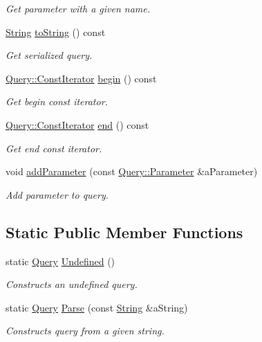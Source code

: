 \begin{DoxyCompactItemize}
\begin{DoxyCompactList}\small\item\em Get parameter with a given name. \end{DoxyCompactList}\item 
\hyperlink{namespaceostk_1_1io_a95d49b120613a7610cb1b4f03b1116b6}{String} \hyperlink{classostk_1_1io_1_1url_1_1_query_aca282853530302e594b16700c83169d9}{to\+String} () const
\begin{DoxyCompactList}\small\item\em Get serialized query. \end{DoxyCompactList}\item 
\hyperlink{classostk_1_1io_1_1url_1_1_query_a64eb73f998c55a48d25b4ce116d66f1a}{Query\+::\+Const\+Iterator} \hyperlink{classostk_1_1io_1_1url_1_1_query_a6c40e85de4a1a42ec5c8ee268e074e6f}{begin} () const
\begin{DoxyCompactList}\small\item\em Get begin const iterator. \end{DoxyCompactList}\item 
\hyperlink{classostk_1_1io_1_1url_1_1_query_a64eb73f998c55a48d25b4ce116d66f1a}{Query\+::\+Const\+Iterator} \hyperlink{classostk_1_1io_1_1url_1_1_query_a94eb24357dcf96fb9926903019b057da}{end} () const
\begin{DoxyCompactList}\small\item\em Get end const iterator. \end{DoxyCompactList}\item 
void \hyperlink{classostk_1_1io_1_1url_1_1_query_a9937aa1e0a99c2f2fd78ec9795f1f2df}{add\+Parameter} (const \hyperlink{classostk_1_1io_1_1url_1_1_query_1_1_parameter}{Query\+::\+Parameter} \&a\+Parameter)
\begin{DoxyCompactList}\small\item\em Add parameter to query. \end{DoxyCompactList}\end{DoxyCompactItemize}
\subsection*{Static Public Member Functions}
\begin{DoxyCompactItemize}
\item 
static \hyperlink{classostk_1_1io_1_1url_1_1_query}{Query} \hyperlink{classostk_1_1io_1_1url_1_1_query_a25f41e04f41e40fd63519e377829323f}{Undefined} ()
\begin{DoxyCompactList}\small\item\em Constructs an undefined query. \end{DoxyCompactList}\item 
static \hyperlink{classostk_1_1io_1_1url_1_1_query}{Query} \hyperlink{classostk_1_1io_1_1url_1_1_query_aa61f25b072cbbe0973142fdf283bf499}{Parse} (const \hyperlink{namespaceostk_1_1io_a95d49b120613a7610cb1b4f03b1116b6}{String} \&a\+String)
\begin{DoxyCompactList}\small\item\em Constructs query from a given string. \end{DoxyCompactList}\end{DoxyCompactItemize}


